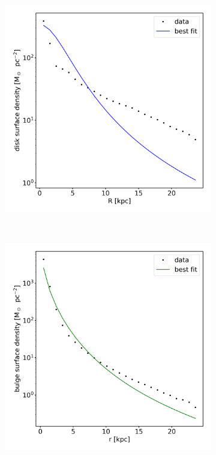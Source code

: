 \iffalse
\begin{figure}
\captionsetup{format=plain}
    \centering
    \begin{subfigure}[b]{0.3\textwidth}
	    \includegraphics[width=\textwidth]{plots/Auriga/surface_dens_disk_fit_data.png}
	    \label{fig:disk_surfdens_fit}
    \end{subfigure}
    ~ %
    \begin{subfigure}[b]{0.3\textwidth}
    \centering
    	\includegraphics[width=\textwidth]{plots/Auriga/surface_dens_spher_fit_data.png}

\end{subfigure}
\end{figure}

